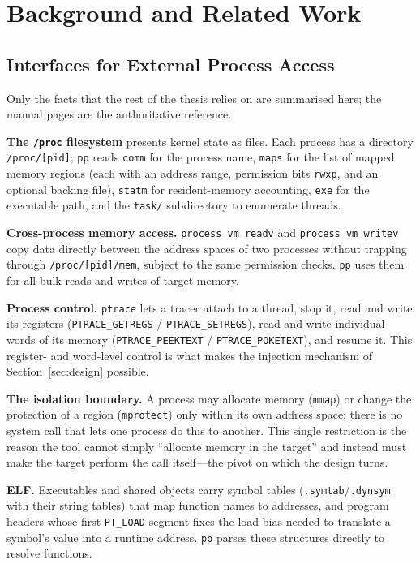 \documentclass[10pt,twocolumn,a4paper]{article}
\begin{document}
\section{Background and Related Work}\label{sec:background}

\subsection{Interfaces for External Process Access}
Only the facts that the rest of the thesis relies on are summarised here; the
manual pages are the authoritative reference.

\textbf{The \texttt{/proc} filesystem} presents kernel state as files. Each
process has a directory \texttt{/proc/[pid]}; \texttt{pp} reads \texttt{comm}
for the process name, \texttt{maps} for the list of mapped memory regions (each
with an address range, permission bits \texttt{rwxp}, and an optional backing
file), \texttt{statm} for resident-memory accounting, \texttt{exe} for the
executable path, and the \texttt{task/} subdirectory to enumerate
threads.

\textbf{Cross-process memory access.} \texttt{process\_vm\_readv} and
\texttt{process\_vm\_writev} copy data directly between the address spaces of
two processes without trapping through \texttt{/proc/[pid]/mem}, subject to the
same permission checks. \texttt{pp} uses them for all bulk reads
and writes of target memory.

\textbf{Process control.} \texttt{ptrace} lets a tracer attach to a thread,
stop it, read and write its registers (\texttt{PTRACE\_GETREGS} /
\texttt{PTRACE\_SETREGS}), read and write individual words of its memory
(\texttt{PTRACE\_PEEKTEXT} / \texttt{PTRACE\_POKETEXT}), and resume
it. This register- and word-level control is what makes the
injection mechanism of Section~\ref{sec:design} possible.

\textbf{The isolation boundary.} A process may allocate memory
(\texttt{mmap}) or change the protection of a region
(\texttt{mprotect}) only within its own address space; there is
no system call that lets one process do this to another. This single
restriction is the reason the tool cannot simply ``allocate memory in the
target'' and instead must make the target perform the call itself---the pivot
on which the design turns.

\textbf{ELF.} Executables and shared objects carry symbol tables
(\texttt{.symtab}/\texttt{.dynsym} with their string tables) that map function
names to addresses, and program headers whose first \texttt{PT\_LOAD} segment
fixes the load bias needed to translate a symbol's value into a runtime
address. \texttt{pp} parses these structures directly to resolve
functions.
\end{document}
